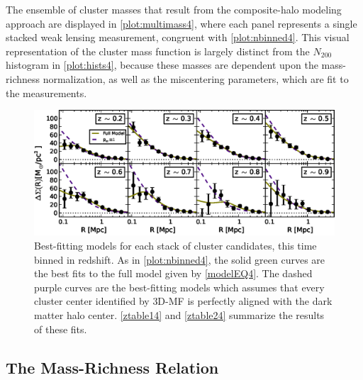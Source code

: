 The ensemble of cluster masses that result from the composite-halo modeling approach are displayed in \autoref{plot:multimass4}, where each panel represents a single stacked weak lensing measurement, congruent with \autoref{plot:nbinned4}. This visual representation of the cluster mass function is largely distinct from the $N_{200}$ histogram in \autoref{plot:hists4}, because these masses are dependent upon the mass-richness normalization, as well as the miscentering parameters, which are fit to the measurements.


\begin{figure}
\begin{center}
  \includegraphics[scale=1.0]{plots_ch4/shearFit_zpanels_fcc0and1_slopeMN1p5_DuttonMaccio.eps}
  \caption[Shear for Redshift-Binned Clusters]{Best-fitting models for each stack of cluster candidates, this time binned in redshift. As in \autoref{plot:nbinned4}, the solid green curves are the best fits to the full model given by \autoref{modelEQ4}. The dashed purple curves are the best-fitting models which assumes that every cluster center identified by \ac{3D-MF} is perfectly aligned with the dark matter halo center. \autoref{ztable14} and \autoref{ztable24} summarize the results of these fits.}
\label{plot:zbinned4}
\end{center}
\end{figure}


\subsection{The Mass-Richness Relation}


